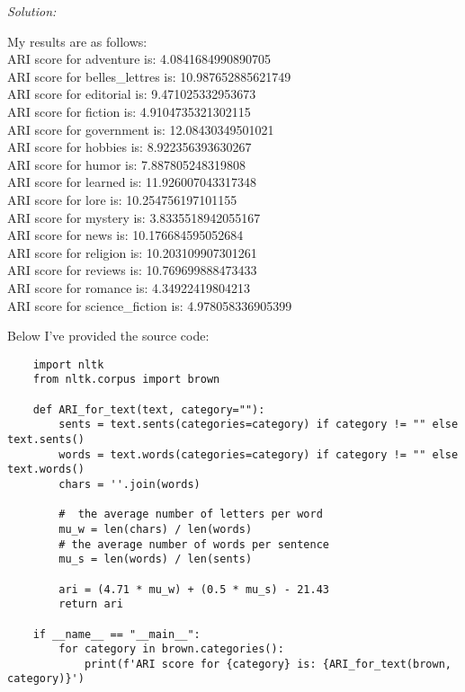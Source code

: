 \documentclass[11pt]{article}
\newenvironment{solution}{
	\vspace{10px}\noindent\emph{Solution:}
}{
	\vspace{10px}
}
\begin{document}
\begin{solution}
	
	My results are as follows: 
	\\ \indent ARI score for adventure is: 4.0841684990890705
	\\ \indent ARI score for belles\_lettres is: 10.987652885621749
	\\ \indent ARI score for editorial is: 9.471025332953673
	\\ \indent ARI score for fiction is: 4.9104735321302115
	\\ \indent ARI score for government is: 12.08430349501021
	\\ \indent ARI score for hobbies is: 8.922356393630267
	\\ \indent ARI score for humor is: 7.887805248319808
	\\ \indent ARI score for learned is: 11.926007043317348
	\\ \indent ARI score for lore is: 10.254756197101155
	\\ \indent ARI score for mystery is: 3.8335518942055167
	\\ \indent ARI score for news is: 10.176684595052684
	\\ \indent ARI score for religion is: 10.203109907301261
	\\ \indent ARI score for reviews is: 10.769699888473433
	\\ \indent ARI score for romance is: 4.34922419804213
	\\ \indent ARI score for science\_fiction is: 4.978058336905399
	
	Below I've provided the source code: 
	
	\begin{lstlisting}
	import nltk 
	from nltk.corpus import brown
	
	def ARI_for_text(text, category=""): 
		sents = text.sents(categories=category) if category != "" else text.sents()
		words = text.words(categories=category) if category != "" else text.words()
		chars = ''.join(words)
		
		#  the average number of letters per word 
		mu_w = len(chars) / len(words)
		# the average number of words per sentence
		mu_s = len(words) / len(sents)
		
		ari = (4.71 * mu_w) + (0.5 * mu_s) - 21.43
		return ari
	
	if __name__ == "__main__":
		for category in brown.categories(): 
			print(f'ARI score for {category} is: {ARI_for_text(brown, category)}')
	\end{lstlisting}
	
\end{solution} 
\end{document}
